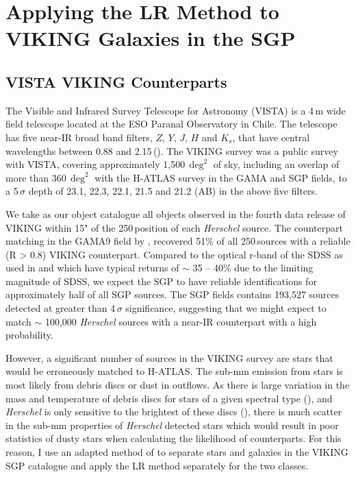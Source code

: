 \section{Applying the LR Method to VIKING Galaxies in the SGP}
\subsection{VISTA VIKING Counterparts}

The Visible and Infrared Survey Telescope for Astronomy (VISTA) is a 4\,m wide field telescope located at the ESO Paranal Observatory in Chile. The telescope has five near-IR broad band filters, $Z$, $Y$, $J$, $H$ and $K_s$, that have central wavelengths between 0.88 and 2.15\,\micron (\citealt{Emerson_2010}). The VIKING survey was a public survey with VISTA, covering approximately 1,500\,$\deg^{2}$ of sky, including an overlap of more than 360\,$\deg^{2}$ with the H-ATLAS survey in the GAMA and SGP fields, to a 5\,$\sigma$ depth of 23.1, 22.3, 22.1, 21.5 and 21.2 (AB) in the above five filters.

We take as our object catalogue all objects observed in the fourth data release of VIKING within 15" of the 250\,\micron position of each \textit{Herschel} source. The counterpart matching in the GAMA9 field by \citealt{Fleuren_2012}, recovered 51\% of all 250\,\micron sources with a reliable (R > 0.8) VIKING counterpart. Compared to the optical r-band of the SDSS as used in \citealt{Bourne_2016} and \citealt{Furlanetto_2018} which have typical returns of $\sim$ 35 -- 40\% due to the limiting magnitude of SDSS, we expect the SGP to have reliable identifications for approximately half of all SGP sources. The SGP fields contains 193,527 sources detected at greater than 4\,$\sigma$ significance, suggesting that we might expect to match $\sim$ 100,000 \textit{Herschel} sources with a near-IR counterpart with a high probability.

However, a significant number of sources in the VIKING survey are stars that would be erroneously matched to H-ATLAS. The sub-mm emission from stars is most likely from debris discs or dust in outflows. As there is large variation in the mass and temperature of debris discs for stars of a given spectral type (\citealt{Hillenbrand_2008}), and \textit{Herschel} is only sensitive to the brightest of these discs (\citealt{Thompson_2010}), there is much scatter in the sub-mm properties of \textit{Herschel} detected stars which would result in poor statistics of dusty stars when calculating the likelihood of counterparts. For this reason, I use an adapted method of \citealt{Baldry_2010} to separate stars and galaxies in the VIKING SGP catalogue and apply the LR method separately for the two classes.

